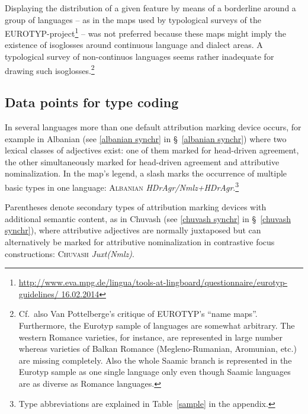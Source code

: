 Displaying the distribution of a given feature by means of a borderline around a group of languages – as in the maps used by typological surveys of the EUROTYP-project\footnote{\url{http://www.eva.mpg.de/lingua/tools-at-lingboard/questionnaire/eurotyp-guidelines/ 16.02.2014}} – was not preferred because these maps might imply the existence of isoglosses around continuous language and dialect areas. A typological survey of non-continuos languages seems rather inadequate for drawing such isoglosses.\footnote{Cf.~also Van Pottelberge's \citeyear{van-pottelberge2001} critique of EUROTYP's “name maps”. Furthermore, the Eurotyp sample of languages are somewhat arbitrary. The western Romance varieties, for instance, are represented in large number whereas varieties of Balkan Romance (Megleno-Rumanian, Aromunian, etc.) are missing completely. Also the whole Saamic branch is represented in the Eurotyp sample as one single language only even though Saamic languages are as diverse as Romance languages.}

\subsection[Type coding]{Data points for type coding}
In several languages more than one default attribution marking device occurs, for example in Albanian (see \ref{albanian synchr} in \S~\ref{albanian synchr}) where two lexical classes of adjectives exist: one of them marked for head-driven agreement, the other simultaneously marked for head-driven agreement and attributive nominalization. In the map's legend, a slash marks the occurrence of multiple basic types in one language: \textsc{Albanian} \textit{HDrAgr/Nmlz+HDrAgr}.\footnote{Type abbreviations are explained in Table~\ref{sample} in the appendix.}

Parentheses denote secondary types of attribution marking devices with additional semantic content, as in Chuvash (see \ref{chuvash synchr} in \S~\ref{chuvash synchr}), where attributive adjectives are normally juxtaposed but can alternatively be marked for attributive nominalization in contrastive focus constructions: \textsc{Chuvash} \textit{Juxt(Nmlz)}.

